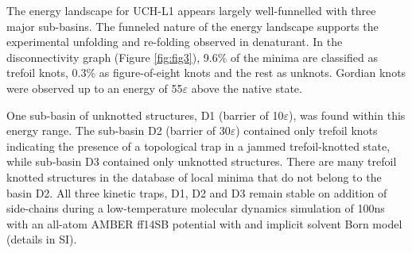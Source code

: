 \documentclass[journal=jacsat]{achemso}
\begin{document}
The energy landscape for UCH-L1 appears largely well-funnelled with three major sub-basins. The funneled nature of the energy landscape supports the experimental unfolding and re-folding observed in denaturant.  In the disconnectivity graph (Figure \ref{fig:fig3}), 9.6\% of the minima are classified as trefoil knots, 0.3\%  as figure-of-eight knots and the rest as unknots. Gordian knots were observed up to an energy of 55$\varepsilon$ above the native state. 

One sub-basin of unknotted structures, D1 (barrier of 10$\varepsilon$), was found within this energy range. The sub-basin D2 (barrier of 30$\varepsilon$)  contained only trefoil knots indicating the presence of a topological trap in a jammed trefoil-knotted state, while sub-basin D3 contained only unknotted structures. There are many trefoil knotted structures in the database of local minima that do not belong to the basin D2. All three kinetic traps, D1, D2 and D3 remain stable on addition of side-chains\cite{Wang08a} during a low-temperature molecular dynamics simulation of 100ns with an all-atom AMBER ff14SB potential with and implicit solvent Born model (details in SI).  
\end{document}
